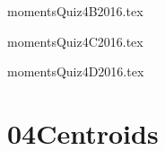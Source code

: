 \documentclass[9pt,xcolor={svgnames, x11names}]{beamer}
\def\scale{1} %
\begin{document}
\begin{frame}{momentsQuiz4B2016.tex }
	\def\scale{0.6}
	\centering
	
\end{frame}
\begin{frame}{momentsQuiz4C2016.tex }
	\def\scale{0.8}
	\centering
	
\end{frame}
\begin{frame}{momentsQuiz4D2016.tex }
	\def\scale{0.8}
	\centering
	
\end{frame}


\section{04Centroids}
\end{document}
